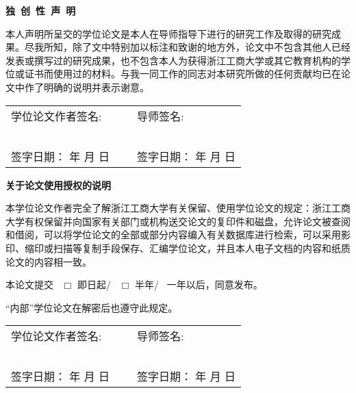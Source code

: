{}
{
\songti
{}

\begin{center}
    \textbf{ \heiti 独~创~性~声~明}
\end{center}

本人声明所呈交的学位论文是本人在导师指导下进行的研究工作及取得的研究成果。尽我所知，除了文中特别加以标注和致谢的地方外，论文中不包含其他人已经发表或撰写过的研究成果，也不包含本人为获得浙江工商大学或其它教育机构的学位或证书而使用过的材料。与我一同工作的同志对本研究所做的任何贡献均已在论文中作了明确的说明并表示谢意。

\vskip 50pt

\begin{center}
     \songti 
    \begin{tabularx}{\linewidth}{ X c X }
        学位论文作者签名: & ~ &导师签名: \\
        ~ & ~ & ~ \\
        签字日期： \qquad 年 \qquad 月 \qquad 日 & ~ &
        签字日期： \qquad 年 \qquad 月 \qquad 日
    \end{tabularx}
\end{center}

\vskip 60pt

\begin{center}
    \textbf{  \heiti 关于论文使用授权的说明}
\end{center}


本学位论文作者完全了解浙江工商大学有关保留、使用学位论文的规定：浙江工商大学有权保留并向国家有关部门或机构送交论文的复印件和磁盘，允许论文被查阅和借阅，可以将学位论文的全部或部分内容编入有关数据库进行检索，可以采用影印、缩印或扫描等复制手段保存、汇编学位论文，并且本人电子文档的内容和纸质论文的内容相一致。

本论文提交~ $\Box$ 即日起/~ $\Box$ 半年/~ \CheckedBox 一年以后，同意发布。

“内部”学位论文在解密后也遵守此规定。
\vskip 50pt

\begin{center}
     \songti 
    \begin{tabularx}{\linewidth}{ X c X }
        学位论文作者签名: & ~ &导师签名: \\
        ~ & ~ & ~ \\
        签字日期： \qquad 年 \qquad 月 \qquad 日 & ~ &
        签字日期： \qquad 年 \qquad 月 \qquad 日
    \end{tabularx}
\end{center}

\vfill

}